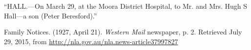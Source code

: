 
``HALL.---On March 29, at the Moora District Hospital, to Mr. and Mrs. Hugh S Hall---a son (Peter Beresford).''

Family Notices. (1927, April 21). \emph{Western Mail} newspaper, p. 2.
Retrieved July 29, 2015, from \url{http://nla.gov.au/nla.news-article37997827}
